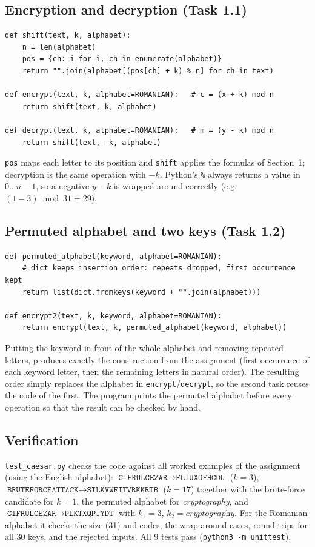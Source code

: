 \documentclass[12pt,a4paper]{article}
\newcommand{\code}[1]{\texttt{\small #1}}
\begin{document}
\subsection{Encryption and decryption (Task 1.1)}

\begin{lstlisting}
def shift(text, k, alphabet):
    n = len(alphabet)
    pos = {ch: i for i, ch in enumerate(alphabet)}
    return "".join(alphabet[(pos[ch] + k) % n] for ch in text)

def encrypt(text, k, alphabet=ROMANIAN):   # c = (x + k) mod n
    return shift(text, k, alphabet)

def decrypt(text, k, alphabet=ROMANIAN):   # m = (y - k) mod n
    return shift(text, -k, alphabet)
\end{lstlisting}
\code{pos} maps each letter to its position and \code{shift} applies the formulas of
Section~1; decryption is the same operation with $-k$. Python's \code{\%} always returns a
value in $0\dots n-1$, so a negative $y-k$ is wrapped around correctly (e.g.\ $(1-3) \bmod 31 = 29$).

\subsection{Permuted alphabet and two keys (Task 1.2)}

\begin{lstlisting}
def permuted_alphabet(keyword, alphabet=ROMANIAN):
    # dict keeps insertion order: repeats dropped, first occurrence kept
    return list(dict.fromkeys(keyword + "".join(alphabet)))

def encrypt2(text, k, keyword, alphabet=ROMANIAN):
    return encrypt(text, k, permuted_alphabet(keyword, alphabet))
\end{lstlisting}
Putting the keyword in front of the whole alphabet and removing repeated letters, produces exactly the construction from the assignment (first
occurrence of each keyword letter, then the remaining letters in natural order).
The resulting order simply replaces the alphabet in \code{encrypt}/\code{decrypt},
so the second task reuses the code of the first. The program prints the permuted
alphabet before every operation so that the result can be checked by hand.

\subsection{Verification}

\code{test\_caesar.py} checks the code against all worked examples of the assignment
(using the English alphabet): $\texttt{CIFRULCEZAR}\to\texttt{FLIUXOFHCDU}$
($k=3$), $\texttt{BRUTEFORCEATTACK}\to\texttt{SILKVWFITVRKKRTB}$ ($k=17$) together
with the brute-force candidate for $k=1$, the permuted alphabet for
\textit{cryptography}, and $\texttt{CIFRULCEZAR}\to\texttt{PLKTXQPJYDT}$ with
$k_1=3$, $k_2=\textit{cryptography}$. For the Romanian alphabet it checks the size
(31) and codes, the wrap-around cases, round trips for all $30$ keys, and the
rejected inputs. All 9 tests pass (\code{python3 -m unittest}).
\end{document}
